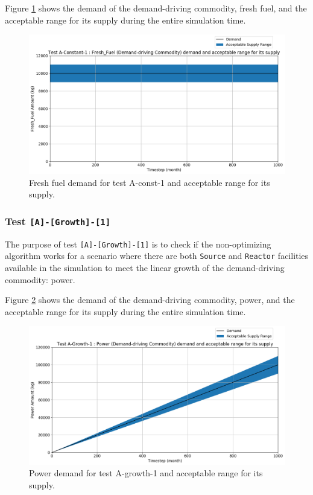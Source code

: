 \documentclass[11pt,letterpaper]{article}
\begin{document}
Figure \ref{fig:test-a-constant-1-demand} shows the demand of the demand-driving commodity, fresh fuel, and the acceptable range for its supply during the entire simulation time.  

\begin{figure}[H]
	\begin{center}
		\includegraphics[scale=0.4]{./figures/Fresh_Fuel_A-Constant-1_demand_supply.png}
	\end{center}
        \caption{Fresh fuel demand for test A-const-1 and acceptable range for its supply.}
	\label{fig:test-a-constant-1-demand}
\end{figure}

\subsubsection{Test \texttt{[A]-[Growth]-[1]}}
The purpose of test \texttt{[A]-[Growth]-[1]} is to check if the non-optimizing algorithm works for a scenario where there are both \texttt{Source} and \texttt{Reactor} facilities available in the simulation to meet the linear growth of the demand-driving commodity: power. 

Figure \ref{fig:test-a-growth-1-demand} shows the demand of the demand-driving commodity, power, and the acceptable range for its supply during the entire simulation time.  

\begin{figure}[H]
	\begin{center}
		\includegraphics[scale=0.4]{./figures/Power_A-Growth-1_demand_supply.png}
	\end{center}
        \caption{Power demand for test A-growth-1 and acceptable range for its supply.}
	\label{fig:test-a-growth-1-demand}
\end{figure}
\end{document}
